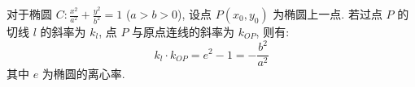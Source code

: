 \begin{statementbox}
对于椭圆 $C: \frac{x^2}{a^2} + \frac{y^2}{b^2} = 1$ ($a>b>0$), 设点 $P(x_0, y_0)$ 为椭圆上一点. 若过点 $P$ 的切线 $l$ 的斜率为 $k_l$, 点 $P$ 与原点连线的斜率为 $k_{OP}$, 则有:
\begin{equation*}
    k_l \cdot k_{OP} = e^2 - 1 = -\frac{b^2}{a^2}
\end{equation*}
其中 $e$ 为椭圆的离心率.
\end{statementbox}